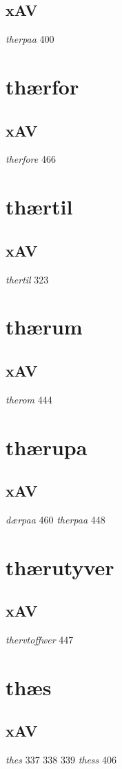 \documentclass[a4paper,twocolumn]{article}
\begin{document}
\subsection{xAV}
\label{sec:org881dcc2}
\emph{therpaa} 400 
\section{thærfor}
\label{sec:orgedab463}
\subsection{xAV}
\label{sec:orgf971348}
\emph{therfore} 466 
\section{thærtil}
\label{sec:orgc507020}
\subsection{xAV}
\label{sec:orgcd84981}
\emph{thertil} 323 
\section{thærum}
\label{sec:orge50fca0}
\subsection{xAV}
\label{sec:org8e7066e}
\emph{therom} 444 
\section{thærupa}
\label{sec:org72c3241}
\subsection{xAV}
\label{sec:org678f16d}
\emph{dærpaa} 460 \emph{therpaa} 448 
\section{thærutyver}
\label{sec:orgfaff277}
\subsection{xAV}
\label{sec:org603e336}
\emph{thervtoffwer} 447 
\section{thæs}
\label{sec:org224f74b}
\subsection{xAV}
\label{sec:orgc0df55b}
\emph{thes} 337 338 339 \emph{thess} 406 
\end{document}
